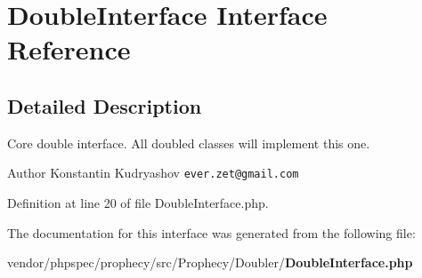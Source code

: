 \section{Double\+Interface Interface Reference}
\label{interface_prophecy_1_1_doubler_1_1_double_interface}


\subsection{Detailed Description}
Core double interface. All doubled classes will implement this one.

\begin{DoxyAuthor}{Author}
Konstantin Kudryashov {\tt ever.\+zet@gmail.\+com} 
\end{DoxyAuthor}


Definition at line 20 of file Double\+Interface.\+php.



The documentation for this interface was generated from the following file\+:\begin{DoxyCompactItemize}
\item 
vendor/phpspec/prophecy/src/\+Prophecy/\+Doubler/{\bf Double\+Interface.\+php}\end{DoxyCompactItemize}
